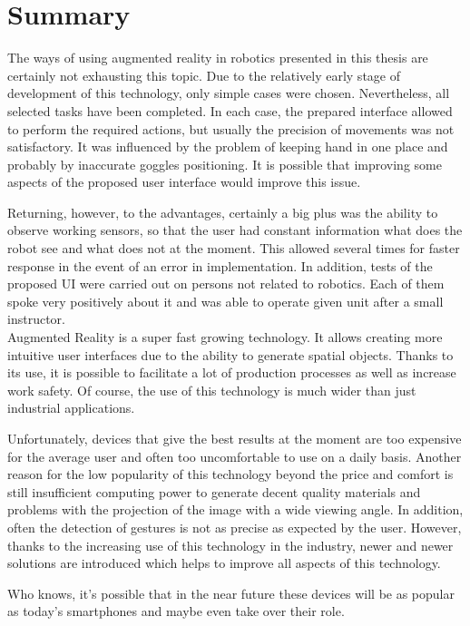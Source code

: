 \documentclass[printmode,en]{mgr}
\begin{document}
\chapter{Summary}
The ways of using augmented reality in robotics presented in this thesis are certainly not exhausting this topic. Due to the relatively early stage of development of this technology, only simple cases were chosen. Nevertheless, all selected tasks have been completed. In each case, the prepared interface allowed to perform the required actions, but usually the precision of movements was not satisfactory. It was influenced by the problem of keeping hand in one place and probably by inaccurate goggles positioning. It is possible that improving some aspects of the proposed user interface would improve this issue.

Returning, however, to the advantages, certainly a big plus was the ability to observe working sensors, so that the user had constant information what does the robot see and what does not at the moment. This allowed several times for faster response in the event of an error in implementation. In addition, tests of the proposed UI were carried out on persons not related to robotics. Each of them spoke very positively about it and was able to operate given unit after a small instructor.\\

Augmented Reality is a super fast growing technology. It allows creating more intuitive user interfaces due to the ability to generate spatial objects. Thanks to its use, it is possible to facilitate a lot of production processes as well as increase work safety. Of course, the use of this technology is much wider than just industrial applications.

Unfortunately, devices that give the best results at the moment are too expensive for the average user and often too uncomfortable to use on a daily basis. Another reason for the low popularity of this technology beyond the price and comfort is still insufficient computing power to generate decent quality materials and problems with the projection of the image with a wide viewing angle. In addition, often the detection of gestures is not as precise as expected by the user. However, thanks to the increasing use of this technology in the industry, newer and newer solutions are introduced which helps to improve all aspects of this technology.

Who knows, it's possible that in the near future these devices will be as popular as today's smartphones and maybe even take over their role.

\appendix




\end{document}
